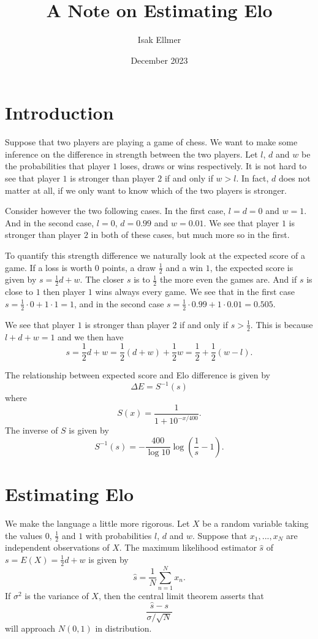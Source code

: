 \documentclass{article}
\title{A Note on Estimating Elo}
\author{Isak Ellmer}
\date{December 2023}
\theoremstyle{plain}
\theoremstyle{definition}
\begin{document}
\maketitle

\section{Introduction}
Suppose that two players are playing a game of chess. We want to make some inference
on the difference in strength between the two players. Let $l$, $d$ and $w$ be the
probabilities that player $1$ loses, draws or wins respectively. It is not hard to see
that player $1$ is stronger than player $2$ if and only if $w>l$. In fact, $d$ does not
matter at all, if we only want to know which of the two players is stronger.

Consider however the two following cases. In the first case, $l=d=0$ and $w=1$. And in
the second case, $l=0$, $d=0.99$ and $w=0.01$. We see that player $1$ is stronger than
player $2$ in both of these cases, but much more so in the first.

To quantify this
strength difference we naturally look at the expected score of a game. If a loss is worth
$0$ points, a draw $\frac12$ and a win $1$, the expected score is given by
$s=\frac12d+w$. The closer $s$ is to $\frac12$ the more even the games are. And if $s$
is close to $1$ then player $1$ wins always every game. We see that in the first case
$s=\frac12\cdot0+1\cdot1=1$, and in the second case $s=\frac12\cdot0.99+1\cdot0.01=0.505$.

We see that player $1$ is stronger than player $2$ if and only if $s>\frac12$. This is
because $l+d+w=1$ and we then have
$$s=\frac12d+w=\frac12(d+w)+\frac12w=\frac12+\frac12(w-l).$$

The relationship between expected score and Elo difference \cite{wikipedia_elo} is given
by $$\Delta E=S^{-1}(s)$$ where $$S(x)=\frac1{1+10^{-x/400}}.$$ The inverse of $S$
is given by $$S^{-1}(s)=-\frac{400}{\log10}\log\left(\frac1s-1\right).$$

\section{Estimating Elo}\label{confidence}
We make the language a little more rigorous. Let $X$ be a random variable taking
the values $0$, $\frac12$ and $1$ with probabilities $l$, $d$ and $w$. Suppose that
$x_1,...,x_N$ are independent observations of $X$. The maximum likelihood estimator
$\hat s$ of $s=E(X)=\frac12d+w$ is given by $$\hat s=\frac1N\sum_{n=1}^Nx_n.$$
If $\sigma^2$ is the variance of $X$, then the central limit theorem
\cite{wikipedia_clt} asserts that $$\frac{\hat s-s}{\sigma/\sqrt{N}}$$ will approach
$N(0,1)$ in distribution.
\end{document}

